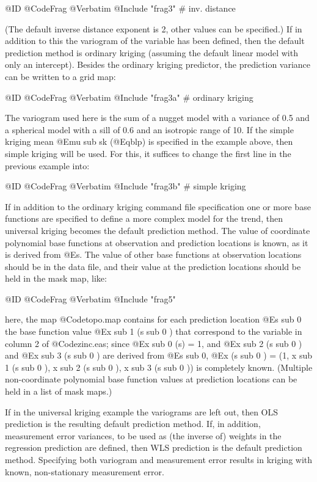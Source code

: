 \documentclass{article}
\begin{document}
@ID @CodeFrag{ @Verbatim { @Include { "frag3" }}} # inv. distance

(The default inverse distance exponent is 2, other values can be
specified.) If in addition to this the variogram of the variable has
been defined, then the default prediction method is ordinary kriging
(assuming the default linear model with only an intercept). Besides the
ordinary kriging predictor, the prediction variance can be written to a
grid map:

@ID @CodeFrag{ @Verbatim { @Include { "frag3a" }}} # ordinary kriging

The variogram used here is the sum of a nugget model with a variance of
0.5 and a spherical model with a sill of 0.6 and an isotropic range of
10. If the simple kriging mean @E{mu sub sk} (@Eqblp) is specified in the
example above, then simple kriging will be used. For this, it suffices
to change the first line in the previous example into:

@ID @CodeFrag{ @Verbatim { @Include { "frag3b" }}} # simple kriging

If in addition to the ordinary kriging command file specification one or
more base functions are specified to define a more complex model for the
trend, then universal kriging becomes the default prediction method.
The value of coordinate polynomial base functions at observation and
prediction locations is known, as it is derived from @E{s}. The value
of other base functions at observation locations should be in the data
file, and their value at the prediction locations should be held in the
mask map, like:

@ID @CodeFrag { @Verbatim { @Include { "frag5" }}}

here, the map @Code{topo.map} contains for each prediction location @E{s
sub 0} the base function value @E{x sub 1 (s sub 0 )} that correspond to
the variable in column 2 of @Code{zinc.eas}; since @E{x sub 0 (s) = 1},
and @E{x sub 2 (s sub 0 )} and @E{x sub 3 (s sub 0 )} are derived from
@E{s sub 0}, @E{x (s sub 0 ) = (1, x sub 1 (s sub 0 ), x sub 2 (s sub 0
), x sub 3 (s sub 0 ))} is completely known. (Multiple non-coordinate
polynomial base function values at prediction locations can be held in a
list of mask maps.)

If in the universal kriging example the variograms are left out, then OLS
prediction is the resulting default prediction method. If, in addition,
measurement error variances, to be used as (the inverse of) weights
in the regression prediction are defined, then WLS prediction is the
default prediction method. Specifying both variogram and measurement
error results in kriging with known, non-stationary measurement error.
\end{document}
